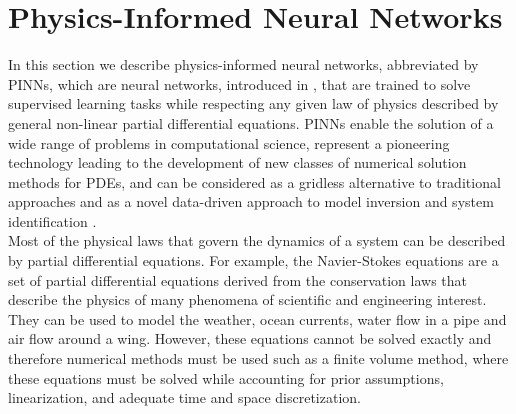 \section{Physics-Informed Neural Networks}
\label{ch1:sec4}

In this section we describe physics-informed neural networks, abbreviated by PINNs, which are neural networks, introduced in \cite{RaissiPerdikarisKarniadakisPart1:2017}, that are trained to solve supervised learning tasks while respecting any given law of physics described by general non-linear partial differential equations. PINNs enable the solution of a wide range of problems in computational science, represent a pioneering technology leading to the development of new classes of numerical solution methods for PDEs, and can be considered as a gridless alternative to traditional approaches and as a novel data-driven approach to model inversion and system identification \cite[p.~3]{RaissiPerdikarisKarniadakis:2019}. \\
Most of the physical laws that govern the dynamics of a system can be described by partial differential equations. For example, the Navier-Stokes equations are a set of partial differential equations derived from the conservation laws that describe the physics of many phenomena of scientific and engineering interest. They can be used to model the weather, ocean currents, water flow in a pipe and air flow around a wing. However, these equations cannot be solved exactly and therefore numerical methods must be used such as a finite volume method, where these equations must be solved while accounting for prior assumptions, linearization, and adequate time and space discretization. \\
